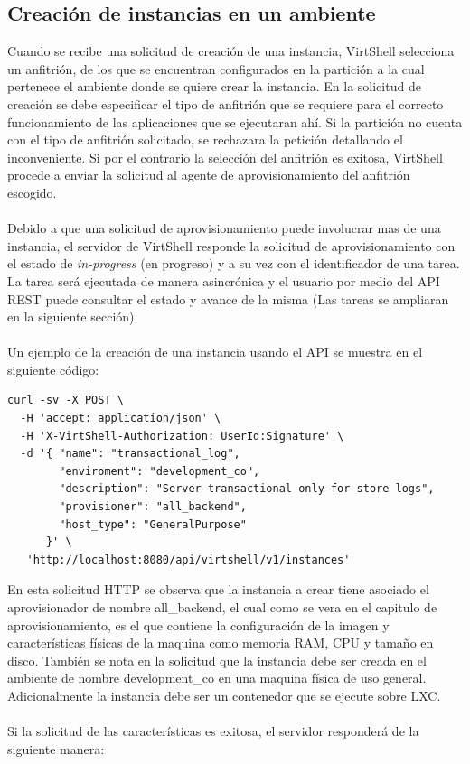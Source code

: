 \subsection{Creación de instancias en un ambiente}
Cuando se recibe una solicitud de creación de una instancia, VirtShell selecciona un anfitrión, de los que se encuentran configurados en la partición a la cual pertenece el ambiente donde se quiere crear la instancia. En la solicitud de creación se debe especificar el tipo de anfitrión que se requiere para el correcto funcionamiento de las aplicaciones que se ejecutaran ahí. Si la partición no cuenta con el tipo de anfitrión solicitado, se rechazara la petición detallando el inconveniente. Si por el contrario la selección del anfitrión es exitosa, VirtShell procede a enviar la solicitud al agente de aprovisionamiento del anfitrión escogido. \\
\\
Debido a que una solicitud de aprovisionamiento puede involucrar mas de una instancia, el servidor de VirtShell responde la solicitud de aprovisionamiento con el estado de \emph{in-progress} (en progreso) y a su vez con el identificador de una tarea. La tarea será ejecutada de manera asincrónica y el usuario por medio del API REST puede consultar el estado y avance de la misma (Las tareas se ampliaran en la siguiente sección).\\
\\
Un ejemplo de la creación de una instancia usando el API se muestra en el siguiente código:

\begin{lstlisting}[style=json, caption=Petición HTTP para crear una instancia]
curl -sv -X POST \
  -H 'accept: application/json' \
  -H 'X-VirtShell-Authorization: UserId:Signature' \
  -d '{ "name": "transactional_log",
        "enviroment": "development_co",
        "description": "Server transactional only for store logs", 
        "provisioner": "all_backend",
        "host_type": "GeneralPurpose"
      }' \
   'http://localhost:8080/api/virtshell/v1/instances'
\end{lstlisting}

\vspace{5mm}

En esta solicitud HTTP se observa que la instancia a crear tiene asociado el aprovisionador de nombre all\_backend, el cual como se vera en el capitulo de aprovisionamiento, es el que contiene la configuración de la imagen y características físicas de la maquina como memoria RAM, CPU y tamaño en disco. También se nota en la solicitud que la instancia debe ser creada en el ambiente de nombre development\_co en una maquina física de uso general. Adicionalmente la instancia debe ser un contenedor que se ejecute sobre LXC.\\
\\
Si la solicitud de las características es exitosa, el servidor responderá de la siguiente manera:

